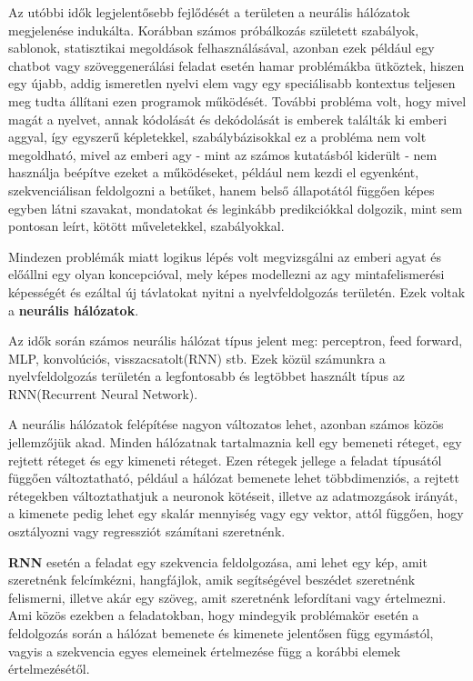 
Az utóbbi idők legjelentősebb fejlődését a területen a neurális hálózatok megjelenése indukálta. Korábban számos próbálkozás született szabályok, sablonok, statisztikai megoldások felhasználásával, azonban ezek például egy chatbot vagy szöveggenerálási feladat esetén hamar problémákba ütköztek, hiszen egy újabb, addig ismeretlen nyelvi elem vagy egy speciálisabb kontextus teljesen meg tudta állítani ezen programok működését. További probléma volt, hogy mivel magát a nyelvet, annak kódolását és dekódolását is emberek találták ki emberi aggyal, így egyszerű képletekkel, szabálybázisokkal ez a probléma nem volt megoldható, mivel az emberi agy - mint az számos kutatásból kiderült - nem használja beépítve ezeket a működéseket, például nem kezdi el egyenként, szekvenciálisan feldolgozni a betűket, hanem belső állapotától függően képes egyben látni szavakat, mondatokat és leginkább predikciókkal dolgozik, mint sem pontosan leírt, kötött műveletekkel, szabályokkal.


Mindezen problémák miatt logikus lépés volt megvizsgálni az emberi agyat és előállni egy olyan koncepcióval, mely képes modellezni az agy mintafelismerési képességét és ezáltal új távlatokat nyitni a nyelvfeldolgozás területén. Ezek voltak a \textbf{neurális hálózatok}.

Az idők során számos neurális hálózat típus jelent meg: perceptron, feed forward, MLP, konvolúciós, visszacsatolt(RNN) stb. Ezek közül számunkra a nyelvfeldolgozás területén a legfontosabb és legtöbbet használt típus az RNN(Recurrent Neural Network).

A neurális hálózatok felépítése nagyon változatos lehet, azonban számos közös jellemzőjük akad. Minden hálózatnak tartalmaznia kell egy bemeneti réteget, egy rejtett réteget és egy kimeneti réteget. Ezen rétegek jellege a feladat típusától függően változtatható, például a hálózat bemenete lehet többdimenziós, a rejtett rétegekben változtathatjuk a neuronok kötéseit, illetve az adatmozgások irányát, a kimenete pedig lehet egy skalár mennyiség vagy egy vektor, attól függően, hogy osztályozni vagy regressziót számítani szeretnénk.

\textbf{RNN} esetén a feladat egy szekvencia feldolgozása, ami lehet egy kép, amit szeretnénk felcímkézni, hangfájlok, amik segítségével beszédet szeretnénk felismerni, illetve akár egy szöveg, amit szeretnénk lefordítani vagy értelmezni. Ami közös ezekben a feladatokban, hogy mindegyik problémakör esetén a feldolgozás során a hálózat bemenete és kimenete jelentősen függ egymástól, vagyis a szekvencia egyes elemeinek értelmezése függ a korábbi elemek értelmezésétől.

